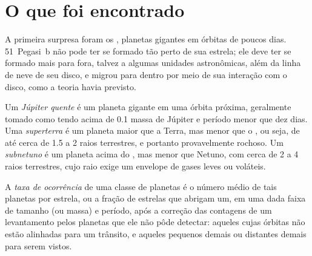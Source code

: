 
\section{O que foi encontrado}\label{sec:b3:exoplanets:found}

A primeira surpresa foram os , planetas gigantes em órbitas de
poucos dias. 51~Pegasi~b não pode ter se formado tão perto de sua estrela; ele deve
ter se formado mais para fora, talvez a algumas unidades astronômicas, além da
linha de neve de seu disco, e migrou para dentro por meio de sua interação com
o disco, como a teoria havia previsto.

\begin{definition}\label{def:b3:exoplanets:classes}
Um \emph{Júpiter quente} é um planeta gigante em uma órbita próxima,
geralmente tomado como tendo  acima de 0.1 massa de Júpiter e período
menor que dez dias. Uma \emph{superterra} é um planeta
maior que a Terra, mas menor que o , ou seja, de até
cerca de 1.5 a 2 raios terrestres, e portanto provavelmente rochoso. Um \emph{subnetuno}
é um planeta acima do , mas menor que Netuno, com cerca de 2 a
4 raios terrestres, cujo raio exige um envelope de gases leves ou
voláteis.
\end{definition}

\begin{definition}\label{def:b3:exoplanets:occurrence}
A \emph{taxa de ocorrência} de uma classe de planetas é
o número médio de tais planetas por estrela, ou a fração de estrelas que
abrigam um, em uma dada faixa de tamanho (ou massa) e período, após a
correção das contagens de um levantamento pelos planetas que ele não pôde detectar:
aqueles cujas órbitas não estão alinhadas para um trânsito, e aqueles pequenos demais ou
distantes demais para serem vistos.
\end{definition}

